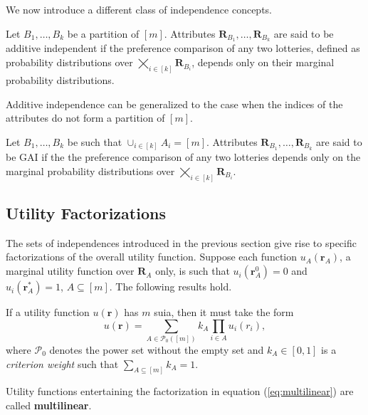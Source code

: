 We now introduce a different class of independence concepts. 

\begin{definition}
Let $B_1,\dots,B_k$ be a partition of $[m]$. Attributes $\bm{R}_{B_1},\dots, \bm{R}_{B_k}$ are said  to be additive independent if the preference comparison of any two lotteries, defined as probability distributions over $\bigtimes_{i\in[k]} \bm{R}_{B_i}$, depends only on their marginal probability distributions.
\end{definition}

Additive independence can be generalized to the case when the indices of the attributes do not form a partition of $[m]$. 
\begin{definition}
\label{def:GAI}
Let $B_1,\dots,B_k$ be such that $\cup_{i\in[k]}A_i=[m]$. Attributes $\bm{R}_{B_1},\dots, \bm{R}_{B_k}$ are said to be \gls{GAI} if the the preference comparison of any two lotteries depends only on the marginal probability distributions over $\bigtimes_{i\in[k]} \bm{R}_{B_i}$.
\end{definition}

\subsection{Utility Factorizations}
The sets of independences introduced in the previous section give rise to specific factorizations of the overall utility function. Suppose each function $u_A(\bm{r}_A)$, a marginal utility function over $\bm{R}_A$ only, is such that $u_i(\bm{r}_A^0)=0$ and $u_i(\bm{r}_A^*)=1$, $A\subseteq [m]$. The following results hold.

\begin{proposition}
If a utility function $u(\bm{r})$ has $m$ \gls{suia}, then it must take the form 
\begin{equation}
\label{eq:multilinear}
u(\bm{r})=\sum_{A\in\mathcal{P}_0([m])}k_A\prod_{i\in A} u_i(r_i),
\end{equation}
where $\mathcal{P}_0$ denotes the power set without the empty set and $k_A\in [0,1]$ is a \textit{criterion weight} \citep{Keeney1993a} such that $\sum_{A\subseteq[m]}k_A=1$.
\end{proposition} 

\begin{definition}
\label{def:multilinear}
Utility functions entertaining the factorization in equation (\ref{eq:multilinear}) are called \textbf{multilinear}.
\end{definition}

